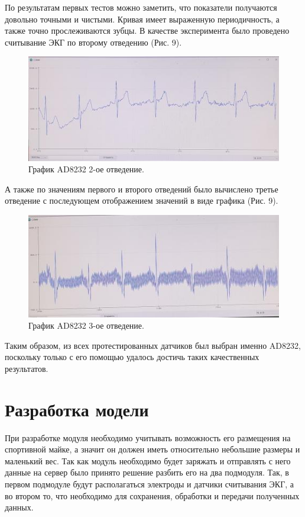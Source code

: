 \documentclass[12pt, russian]{extarticle}
\begin{document}
\begin{spacing}{1.5}
По результатам первых тестов можно заметить, что показатели получаются довольно точными и чистыми. Кривая имеет выраженную периодичность, а также точно прослеживаются зубцы. В качестве эксперимента было проведено считывание ЭКГ по второму отведению (Рис. 9).

\begin{figure}[htbp]
\centering
\includegraphics[scale=0.8]{resources/ad8232/2е-отведение.jpg}
\caption{График AD8232 2-ое отведение.}
\label{fig:my_label}
\end{figure}

А также по значениям первого и второго отведений было вычислено третье отведение с последующем отображением значений в виде графика (Рис. 9).

\begin{figure}[htbp]
\centering
\includegraphics[scale=0.8]{resources/ad8232/3е-отведение.jpg}
\caption{График AD8232 3-ое отведение.}
\label{fig:my_label}
\end{figure}

Таким образом, из всех протестированных датчиков был выбран именно AD8232, поскольку только с его помощью удалось достичь таких качественных результатов.

\section{Разработка модели}

При разработке модуля необходимо учитывать возможность его размещения на спортивной майке, а значит он должен иметь относительно небольшие размеры и маленький вес. Так как модуль необходимо будет заряжать и отправлять с него данные на сервер было принято решение разбить его на два подмодуля. Так, в первом подмодуле будут располагаться электроды и датчики считывания ЭКГ, а во втором то, что необходимо для сохранения, обработки и передачи полученных данных.


\end{spacing}
\end{document}
